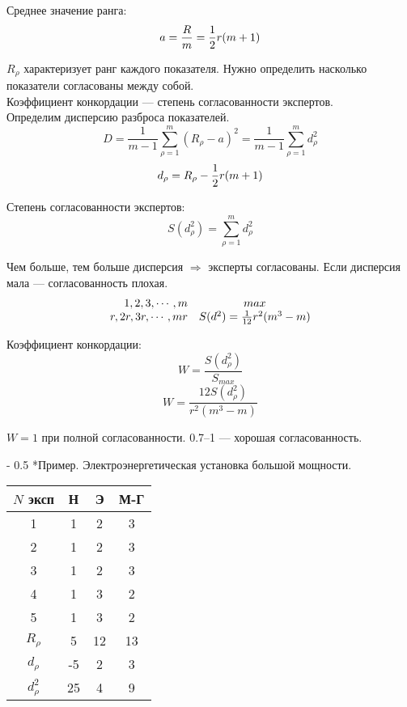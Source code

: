 \documentclass[12pt,a5paper]{scrbook}
\makeatletter
\renewcommand\paragraph{\@startsection{paragraph}{4}{0mm}%
{-\baselineskip} %
{0.5\baselineskip} %
{\normalfont\bfseries}}%
\makeatother
\begin{document}
  Среднее значение ранга:
  $$a={R \over m} = {1 \over 2}r(m+1)$$
  
  $R_{\rho}$ характеризует ранг каждого показателя. Нужно определить насколько показатели согласованы между собой.\\
  
  Коэффициент конкордации --- степень согласованности экспертов.\\
  
  Определим дисперсию разброса показателей.
  $$D=\frac{1}{m-1}\sum_{\rho=1}^m (R_{\rho}-a)^2 = \frac{1}{m-1}\sum_{\rho=1}^m d_{\rho}^2$$
  $$d_{\rho} = R_{\rho} - {1 \over 2}r(m+1)$$
  
  Степень согласованности экспертов:
  $$S(d_{\rho}^2) = \sum_{\rho=1}^m d_{\rho}^2$$
  
  Чем больше, тем больше дисперсия $\Rightarrow$ эксперты согласованы. Если дисперсия мала --- согласованность плохая.
  \[
    \begin{array}{r c}
      1,2,3,\cdots,m & max \\
      r,2r,3r,\cdots,mr & S(d^2)={1 \over 12}r^2(m^3-m) \\
    \end{array}
  \]
  
  Коэффициент конкордации:
  $$W=\frac{S(d_{\rho}^2)}{S_{max}}$$
  $$W=\frac{12S(d_{\rho}^2)}{r^2(m^3-m)}$$
  
  $W=1$ при полной согласованности. 0.7--1 --- хорошая согласованность.
  
  \paragraph*{Пример.}
  Электроэнергетическая установка большой мощности.
  
  
  \begin{tabular}{c|c|c|c}
    $N$ эксп & Н & Э & М-Г\\
    \hline
    1 & 1 & 2 & 3\\
    2 & 1 & 2 & 3\\
    3 & 1 & 2 & 3\\
    4 & 1 & 3 & 2\\
    5 & 1 & 3 & 2\\
    \hline
    $R_{\rho}$ & 5 & 12 & 13\\
    $d_{\rho}$ & -5 & 2 & 3\\
    $d_{\rho}^2$ & 25 & 4 & 9
  \end{tabular}\\
  
\end{document}
